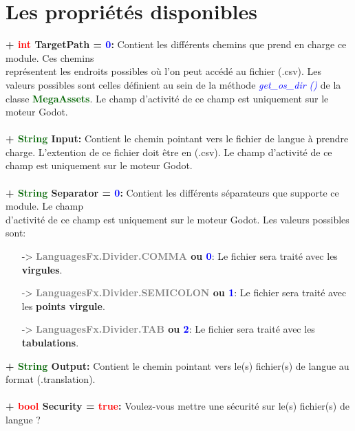 \documentclass[a4paper, 11pt]{article}
\begin{document}
	\section{Les propriétés disponibles}
	\textbf{+ \textcolor{red}{int} \hypertarget{idx}{TargetPath} = \textcolor{blue}{0}:} Contient les 
	différents chemins que prend en charge ce module. Ces chemins \\représentent les endroits possibles où
	l'on peut accédé au fichier (.csv). Les valeurs possibles sont celles définient au sein de la méthode
	\textit{\textcolor{blue}{get\_os\_dir ()}} de la classe \textbf{\textcolor{darkgreen}{MegaAssets}}. Le
	champ d'activité de ce champ est uniquement sur le moteur Godot.\\\\
	\textbf{+ \textcolor{darkgreen}{String} Input:} Contient le chemin pointant vers le fichier de langue à 
	prendre charge. L'extention de ce fichier doit être en (.csv). Le champ d'activité de ce champ est
	uniquement sur le moteur Godot.\\\\
	\textbf{+ \textcolor{darkgreen}{String} Separator = \textcolor{blue}{0}:} Contient les différents
	séparateurs que supporte ce module. Le champ \\d'activité de ce champ est uniquement sur le moteur
	Godot. Les valeurs possibles sont:
	\begin{itemize}
		\item [-> \textbf{\textcolor{gray}{LanguagesFx.Divider.COMMA} ou \textcolor{blue}{0}}:] Le fichier
		sera traité avec les \textbf{virgules}.
		\item [-> \textbf{\textcolor{gray}{LanguagesFx.Divider.SEMICOLON} ou \textcolor{blue}{1}}:] Le
		fichier sera traité avec les \textbf{points virgule}.
		\item [-> \textbf{\textcolor{gray}{LanguagesFx.Divider.TAB} ou \textcolor{blue}{2}}:] Le fichier
		sera traité avec les \textbf{tabulations}.\\
	\end{itemize}
	\textbf{+ \textcolor{darkgreen}{String} Output:} Contient le chemin pointant vers le(s) fichier(s) de
	langue au format (.translation).\\\\
	\textbf{+ \textcolor{red}{bool} \hypertarget{idx}{Security} = \textcolor{red}{true}:} Voulez-vous mettre
	une sécurité sur le(s) fichier(s) de langue ?\\\\
\end{document}
